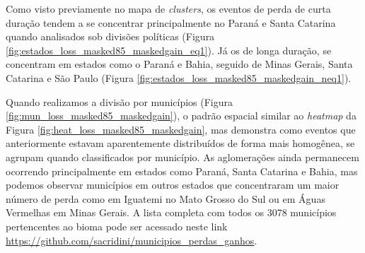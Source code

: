 Como visto previamente no mapa de \textit{clusters}, os eventos de perda de curta duração tendem a se concentrar principalmente no Paraná e Santa Catarina quando analisados sob divisões políticas (Figura \ref{fig:estados_loss_masked85_maskedgain_eq1}). Já os de longa duração, se concentram em estados como o Paraná e Bahia, seguido de Minas Gerais, Santa Catarina e São Paulo (Figura \ref{fig:estados_loss_masked85_maskedgain_neq1}).

Quando realizamos a divisão por municípios (Figura \ref{fig:mun_loss_masked85_maskedgain}), o padrão espacial similar ao \textit{heatmap} da Figura \ref{fig:heat_loss_masked85_maskedgain}, mas demonstra como eventos que anteriormente estavam aparentemente distribuídos de forma mais homogênea, se agrupam quando classificados por município. As aglomerações ainda permanecem ocorrendo principalmente em estados como Paraná, Santa Catarina e Bahia, mas podemos observar municípios em outros estados que concentraram um maior número de perda como em Iguatemi no Mato Grosso do Sul ou em Águas Vermelhas em Minas Gerais. A lista completa com todos os 3078 municípios pertencentes ao bioma pode ser acessado neste link \url{https://github.com/sacridini/municipios_perdas_ganhos}.

